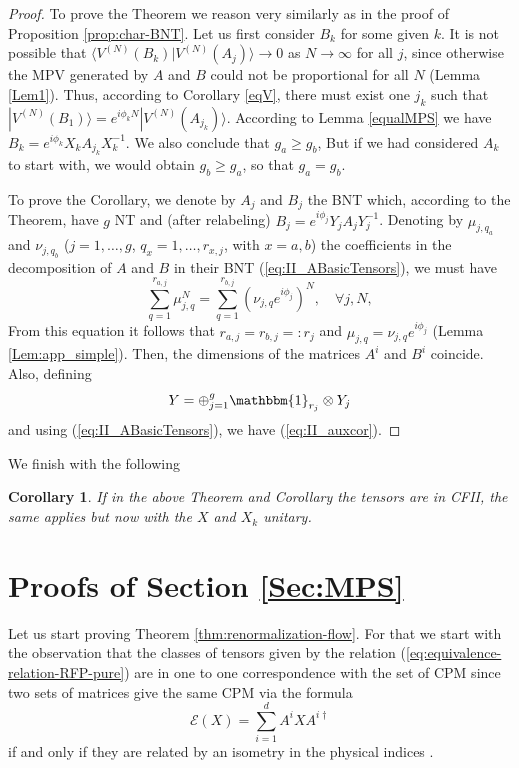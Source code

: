 \documentclass{elsarticle}
\newcommand{\Id}{\mathbbm{1}}
\newcommand{\be}{\begin{equation}}
\newcommand{\ee}{\end{equation}}
\newtheorem{cor}[thm]{Corollary}
\begin{document}
\begin{proof}
To prove the Theorem we reason very similarly as in the proof of Proposition \ref{prop:char-BNT}. Let us first consider $B_k$ for some given $k$. It is not possible that $\langle V^{(N)}(B_k)|V^{(N)}(A_j)\rangle\to 0$ as $N\to\infty$ for all $j$, since otherwise the MPV generated by $A$ and $B$ could not be proportional for all $N$ (Lemma \ref{Lem1}). Thus, according to Corollary \ref{eqV}, there must exist one $j_k$ such that $|V^{(N)}(B_1)\rangle =e^{i\phi_k N} |V^{(N)}(A_{j_k})\rangle$. According to Lemma \ref{equalMPS} we have $B_k = e^{i\phi_k} X_k A_{j_k} X_k^{-1}$. We also conclude that $g_a\ge g_b$, But if we had considered $A_k$ to start with, we would obtain $g_b\ge g_a$, so that $g_a=g_b$.

To prove the Corollary, we denote by $A_j$ and $B_j$ the BNT which, according to the Theorem, have $g$ NT and (after relabeling) $B_j = e^{i\phi_j} Y_j A_{j} Y_j^{-1}$. Denoting by $\mu_{j,q_a}$ and $\nu_{j,q_b}$ ($j=1,\ldots,g$, $q_{x} = 1,\ldots, r_{x,j}$, with $x=a,b$) the coefficients in the decomposition of $A$ and $B$ in their BNT (\ref{eq:II_ABasicTensors}), we must have
 \be
 \sum_{q=1}^{r_{a,j}} \mu_{j,q}^N = \sum_{q=1}^{r_{b,j}} (\nu_{j,q}e^{i\phi_j})^N, \quad \forall j,N,
 \ee
From this equation it follows that $r_{a,j}=r_{b,j}=:r_j$ and $\mu_{j,q}=\nu_{j,q}e^{i\phi_j}$  (Lemma \ref{Lem:app_simple}). Then, the dimensions of the matrices $A^i$ and $B^i$ coincide. Also, defining
 \be
 Y= \oplus_{j=1}^{g} \Id_{r_j}\otimes Y_j
 \ee
and using (\ref{eq:II_ABasicTensors}), we have (\ref{eq:II_auxcor}).
\end{proof}

We finish with the following

\begin{cor}\label{thm:Fundamental-CFII}
If in the above Theorem and Corollary the tensors are in CFII, the same applies but now with the $X$ and $X_k$ unitary.
\end{cor}


\section{Proofs of Section \ref{Sec:MPS}}\label{AppendixPure}

Let us start proving Theorem \ref{thm:renormalization-flow}. For that we start with the observation that the classes of tensors given by the relation (\ref{eq:equivalence-relation-RFP-pure})  are in one to one correspondence with the set of CPM since two sets of matrices give the same CPM via the formula
\be\label{eq:appendix-CPM} \mathcal{E}(X)=\sum_{i=1}^d A^i X A^{i\dagger}
\ee if and only if they are related by an  isometry in the physical indices \cite{Michael-Notes}.
\end{document}
